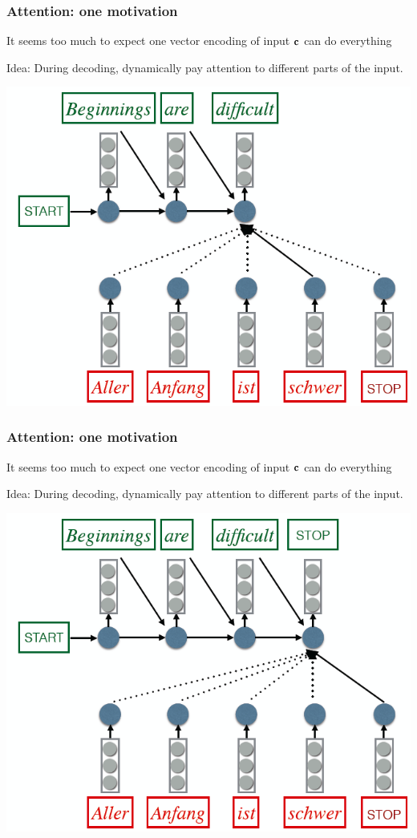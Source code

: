 \begin{frame}
\frametitle{Attention: one motivation \cite{bahdanau14translate}}
\bi
\item It seems too much to expect one vector encoding of input $\bf{c}$ can do everything
\item Idea: During decoding, dynamically {\color{red} pay attention} to different parts of the input.
\ei
\centerline{\includegraphics[scale=0.33]{figs/explain_attention3}}
\end{frame}

\begin{frame}
\frametitle{Attention: one motivation \cite{bahdanau14translate}}
\bi
\item It seems too much to expect one vector encoding of input $\bf{c}$ can do everything
\item Idea: During decoding, dynamically {\color{red} pay attention} to different parts of the input.
\ei
\centerline{\includegraphics[scale=0.33]{figs/explain_attention4}}
\end{frame}


